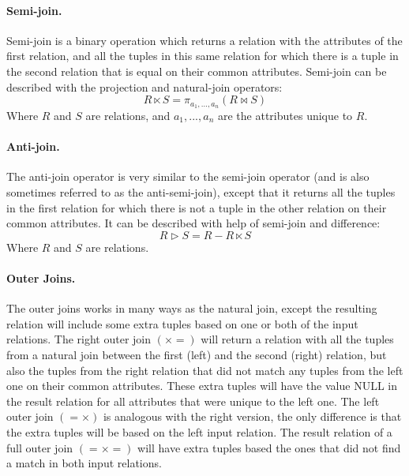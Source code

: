 \paragraph{Semi-join.}
Semi-join is a binary operation which returns a relation with the attributes of the first relation, and all the tuples in this same relation for which there is a tuple in the second relation that is equal on their common attributes. Semi-join can be described with the projection and natural-join operators:
\begin{equation*}
R \ltimes S = \pi _{a_{1},...,a_{n}}(R \bowtie S)
\end{equation*}
Where $R$ and $S$ are relations, and $a_{1},...,a_{n}$ are the attributes unique to $R$.
\paragraph{Anti-join.}
The anti-join operator is very similar to the semi-join operator (and is also sometimes referred to as the anti-semi-join), except that it returns all the tuples in the first relation for which there is not a tuple in the other relation on their common attributes. It can be described with help of semi-join and difference:
\begin{equation*}
R \rhd S = R - R \ltimes S
\end{equation*}
Where $R$ and $S$ are relations.
\paragraph{Outer Joins.}
The outer joins works in many ways as the natural join, except the resulting
relation will include some extra tuples based on one or both of the input
relations. The right outer join $(\times=)$ will return a relation with all
the tuples from a natural join between the first (left) and the second (right)
relation, but also the tuples from the right relation that did not match any
tuples from the left one on their common attributes. These extra tuples will
have the value NULL in the result relation for all attributes that were unique
to the left one. The left outer join $(=\times)$ is analogous with the right
version, the only difference is that the extra tuples will be based on the left
input relation. The result relation of a full outer join $(=\times=)$ will
have extra tuples based the ones that did not find a match in both input
relations.
